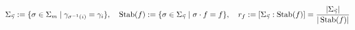 \documentclass[preview]{standalone}
\begin{document}
\begin{align*}
\special{dvisvgm:raw <g id='unique000'>}\Sigma_{\vec{\gamma}} := \{\sigma\in\Sigma_m \mid \gamma_{\sigma^{-1}(i)}=\gamma_i\}, \quad \operatorname{Stab}(f) := \{\sigma\in\Sigma_{\vec{\gamma}} \mid \sigma\cdot f = f\}, \quad r_f := [\Sigma_{\vec{\gamma}} : \operatorname{Stab}(f)] = \frac{|\Sigma_{\vec{\gamma}}|}{|\operatorname{Stab}(f)|}\special{dvisvgm:raw </g>}
\end{align*}
\end{document}
